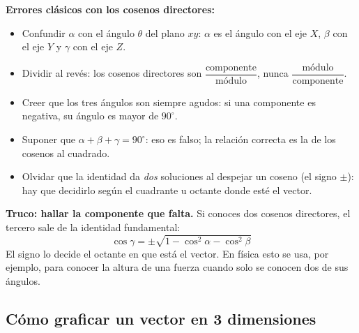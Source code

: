\documentclass[12pt, letterpaper]{article}
\begin{document}
\begin{cuadroadvertencia}
  \textbf{Errores clásicos con los cosenos directores:}
  \begin{itemize}[leftmargin=*]
    \item Confundir $\alpha$ con el ángulo $\theta$ del plano $xy$: $\alpha$ es el ángulo con el eje $X$, $\beta$ con el eje $Y$ y $\gamma$ con el eje $Z$.
    \item Dividir al revés: los cosenos directores son $\dfrac{\text{componente}}{\text{módulo}}$, nunca $\dfrac{\text{módulo}}{\text{componente}}$.
    \item Creer que los tres ángulos son siempre agudos: si una componente es negativa, su ángulo es mayor de $90^{\circ}$.
    \item Suponer que $\alpha + \beta + \gamma = 90^{\circ}$: eso es falso; la relación correcta es la de los cosenos al cuadrado.
    \item Olvidar que la identidad da \emph{dos} soluciones al despejar un coseno (el signo $\pm$): hay que decidirlo según el cuadrante u octante donde esté el vector.
  \end{itemize}
\end{cuadroadvertencia}

\begin{cuadroextra}
  \textbf{Truco: hallar la componente que falta.} Si conoces dos cosenos directores, el tercero sale de la identidad fundamental:
  $$\cos\gamma = \pm\sqrt{1 - \cos^2\alpha - \cos^2\beta}$$
  El signo lo decide el octante en que está el vector. En física esto se usa, por ejemplo, para conocer la altura de una fuerza cuando solo se conocen dos de sus ángulos.
\end{cuadroextra}

\subsection{Cómo graficar un vector en 3 dimensiones}
\end{document}
